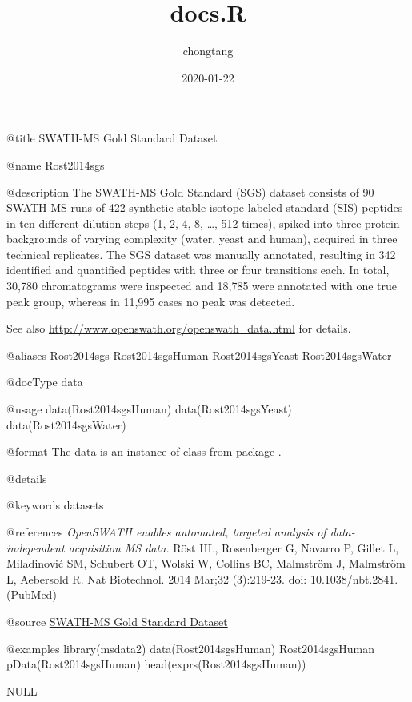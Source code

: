 \documentclass[
]{article}
\title{docs.R}
\author{chongtang}
\date{2020-01-22}
\newenvironment{Shaded}{\begin{snugshade}}{\end{snugshade}}
\newcommand{\OtherTok}[1]{\textcolor[rgb]{0.56,0.35,0.01}{#1}}
\begin{document}
\maketitle

@title SWATH-MS Gold Standard Dataset

@name Rost2014sgs

@description The SWATH-MS Gold Standard (SGS) dataset consists of 90
SWATH-MS runs of 422 synthetic stable isotope-labeled standard (SIS)
peptides in ten different dilution steps (1, 2, 4, 8, \ldots, 512
times), spiked into three protein backgrounds of varying complexity
(water, yeast and human), acquired in three technical replicates. The
SGS dataset was manually annotated, resulting in 342 identified and
quantified peptides with three or four transitions each. In total,
30,780 chromatograms were inspected and 18,785 were annotated with one
true peak group, whereas in 11,995 cases no peak was detected.

See also \url{http://www.openswath.org/openswath_data.html} for details.

@aliases Rost2014sgs Rost2014sgsHuman Rost2014sgsYeast Rost2014sgsWater

@docType data

@usage data(Rost2014sgsHuman) data(Rost2014sgsYeast)
data(Rost2014sgsWater)

@format The data is an instance of class  from package
.

@details

@keywords datasets

@references
\emph{OpenSWATH enables automated, targeted analysis of data-independent
acquisition MS data.} Röst HL, Rosenberger G, Navarro P, Gillet L,
Miladinović SM, Schubert OT, Wolski W, Collins BC, Malmström J,
Malmström L, Aebersold R. Nat Biotechnol. 2014 Mar;32 (3):219-23. doi:
10.1038/nbt.2841.
(\href{https://www.ncbi.nlm.nih.gov/pubmed/23979570}{PubMed})

@source
\href{http://compms.org/resources/reference-data/50}{SWATH-MS Gold Standard Dataset}

@examples library(msdata2) data(Rost2014sgsHuman) Rost2014sgsHuman
pData(Rost2014sgsHuman) head(exprs(Rost2014sgsHuman))

\begin{Shaded}
\begin{Highlighting}[]
\OtherTok{NULL}
\end{Highlighting}
\end{Shaded}
\end{document}
